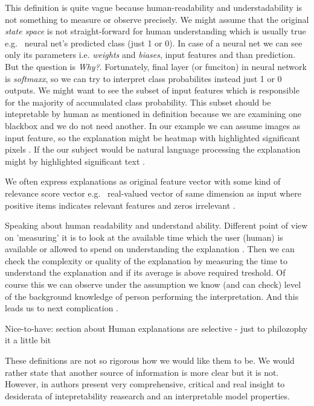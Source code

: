 This definition is quite vague because human-readability and understadability is not something to measure or observe precisely. We might assume that the original \emph{state space} is not straight-forward for human understanding which is usually true e.g. \ neural net's predicted class (just 1 or 0). In case of a neural net we can see only its parameters i.e. \emph{weights} and \emph{biases}, input features and than prediction. But the question is \emph{Why?}. Fortunately, final layer (or funciton) in neural network is \emph{softmaxx}, so we can try to interpret class probabilites instead just 1 or 0 outputs. We might want to see the subset of input features which is responsible for the majority of accumulated class probability. This subset should be intepretable by human as mentioned in definition because we are examining one blackbox and we do not need another. In our example we can assume images as input feature, so the explanation might be heatmap with highlighted significant pixels \cite{Lapuschkin2015, Simonyan2014, Landecker2013}. If the our subject would be natural language processing the explanation might by highlighted significant text \cite{Arras2017, Li2016}.

We often express explanations as original feature vector with some kind of relevance score vector e.g. \ real-valued vector of same dimension as input where positive items indicates relevant features and zeros irrelevant \cite{Montavon2018}.

Speaking about human readability and understand ability. Different point of view on 'measuring' it is to look at the available time which the user (human) is available or allowed to spend on understanding the explanation \cite{Guidotti2018}. Then we can check the complexity or quality of the explanation by measuring the time to understand the explanation and if its average is above required treshold. Of course this we can observe under the assumption we know (and can check) level of the background knowledge of person performing the interpretation. And this leads us to next complication \cite{Guidotti2018}.

Nice-to-have:
\cite{Mittelstadt2019}
section about Human explanations are selective - just to philozophy it a little bit



\cite{Lipton2016}
These definitions are not so rigorous how we would like them to be. We would rather state that another source of information is more clear but it is not. However, in \cite{Lipton2016} authors present very comprehensive, critical and real insight to desiderata of intepretability reasearch and an interpretable model properties.



